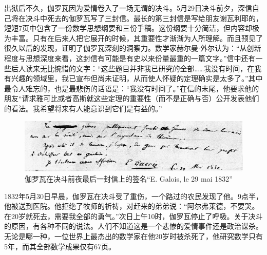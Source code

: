 \documentclass[b5paper]{ctexart}
\begin{document}
出狱后不久，伽罗瓦因为爱情卷入了一场无谓的决斗。5月29日决斗前夕，深信自己将在决斗中死去的伽罗瓦写了三封信。最长的第三封信是写给朋友谢瓦利耶的，短短7页中包含了一份数学思想纲要和三份手稿。这份纲要十分简洁，但内容却极为丰富。只有在后来人把它展开的时候，其重要性才渐渐为人所理解。而且预见了很久以后的发现，证明了伽罗瓦深刻的洞察力。数学家赫尔曼$\cdot$外尔认为：“从创新程度与思想深度来看，这封信有可能是有史以来份量最重的一篇文字。”信中还有一些后人读来无比惋惜的文字：“这些题目并非我已研究的全部……我没有时间，在我有兴趣的领域里，我已宣布但尚未证明，从而使人怀疑的定理确实是太多了。”其中最令人难忘的，也是最悲伤的话语是：“我没有时间了。”在信的末尾，他要求他的朋友“请求雅可比或者高斯就这些定理的重要性（而不是正确与否）公开发表他们的看法。我希望将来有人能意识到它们是有益的。”

\begin{figure}[htbp]
 \centering
 \includegraphics[scale=0.3]{img/GalSign.png}
 \captionsetup{labelformat=empty}
 \caption{伽罗瓦在决斗前夜最后一封信上的签名``E. Galois, le 29 mai 1832''}
 \label{fig:GalSign}
\end{figure}

1832年5月30日早晨，伽罗瓦在决斗受了重伤，一个路过的农民发现了他。9点半，他被送到医院。他拒绝了牧师的祈祷，对赶来的弟弟说：“阿尔弗莱德，不要哭。在20岁就死去，需要我全部的勇气。”次日上午10时，伽罗瓦停止了呼吸。关于决斗的原因，有各种不同的说法。人们不知道这是一个悲惨的爱情事件还是政治谋杀。无论是哪一种，一位世界上最杰出的数学家在他20岁时被杀死了，他研究数学只有5年，而其全部数学成果仅有67页。
\end{document}
